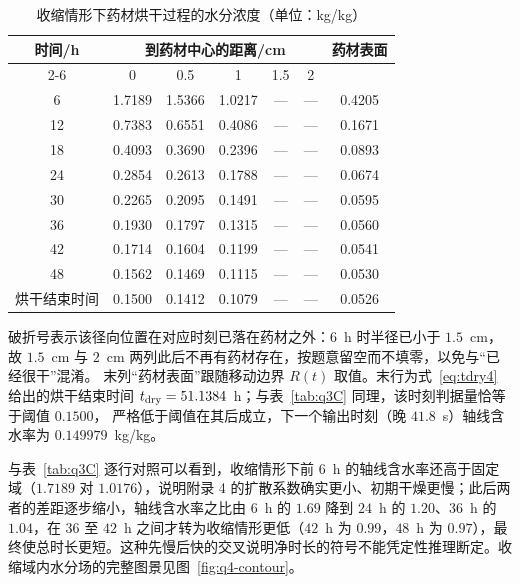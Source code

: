 \begin{table}[H]
\centering
\caption{收缩情形下药材烘干过程的水分浓度（单位：kg/kg）}\label{tab:q4C}
\begin{tabular}{ccccccc}
\toprule
\multirow{2}{*}{时间/h} & \multicolumn{5}{c}{到药材中心的距离/cm} & \multirow{2}{*}{药材表面}\\
\cmidrule(lr){2-6}
 & 0 & 0.5 & 1 & 1.5 & 2 & \\
\midrule
6  & 1.7189 & 1.5366 & 1.0217 & --- & --- & 0.4205 \\
12 & 0.7383 & 0.6551 & 0.4086 & --- & --- & 0.1671 \\
18 & 0.4093 & 0.3690 & 0.2396 & --- & --- & 0.0893 \\
24 & 0.2854 & 0.2613 & 0.1788 & --- & --- & 0.0674 \\
30 & 0.2265 & 0.2095 & 0.1491 & --- & --- & 0.0595 \\
36 & 0.1930 & 0.1797 & 0.1315 & --- & --- & 0.0560 \\
42 & 0.1714 & 0.1604 & 0.1199 & --- & --- & 0.0541 \\
48 & 0.1562 & 0.1469 & 0.1115 & --- & --- & 0.0530 \\
烘干结束时间 & 0.1500 & 0.1412 & 0.1079 & --- & --- & 0.0526 \\
\bottomrule
\end{tabular}

\vspace{0.6em}
\begin{minipage}{0.96\textwidth}
\footnotesize 破折号表示该径向位置在对应时刻已落在药材之外：$6$~h 时半径已小于 $1.5$~cm，
故 $1.5$~cm 与 $2$~cm 两列此后不再有药材存在，按题意留空而不填零，以免与“已经很干”混淆。
末列“药材表面”跟随移动边界 $R(t)$ 取值。末行为式~\eqref{eq:tdry4} 给出的烘干结束时间
$t_{\rm dry}=51.1384$~h；与表~\ref{tab:q3C} 同理，该时刻判据量恰等于阈值 $0.1500$，
严格低于阈值在其后成立，下一个输出时刻（晚 $41.8$~s）轴线含水率为 $0.149979$~kg/kg。
\end{minipage}
\end{table}

与表~\ref{tab:q3C} 逐行对照可以看到，收缩情形下前 $6$~h 的轴线含水率还高于固定域（$1.7189$ 对 $1.0176$），说明附录 4 的扩散系数确实更小、初期干燥更慢；此后两者的差距逐步缩小，轴线含水率之比由 $6$~h 的 $1.69$ 降到 $24$~h 的 $1.20$、$36$~h 的 $1.04$，在 $36$ 至 $42$~h 之间才转为收缩情形更低（$42$~h 为 $0.99$，$48$~h 为 $0.97$），最终使总时长更短。这种先慢后快的交叉说明净时长的符号不能凭定性推理断定。收缩域内水分场的完整图景见图~\ref{fig:q4-contour}。

